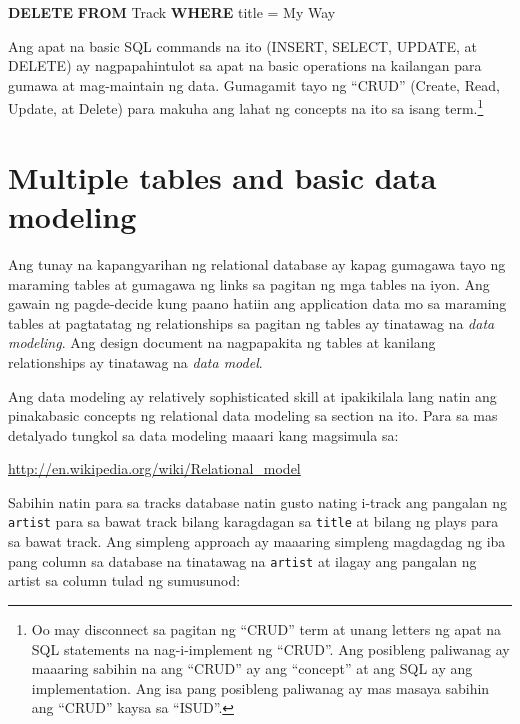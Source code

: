 \documentclass[10pt,]{book}
\newenvironment{Shaded}{}{}
\newcommand{\KeywordTok}[1]{\textcolor[rgb]{0.00,0.44,0.13}{\textbf{#1}}}
\newcommand{\NormalTok}[1]{#1}
\newcommand{\OperatorTok}[1]{\textcolor[rgb]{0.40,0.40,0.40}{#1}}
\newcommand{\StringTok}[1]{\textcolor[rgb]{0.25,0.44,0.63}{#1}}
\begin{document}
\begin{Shaded}
\begin{Highlighting}[]
\KeywordTok{DELETE} \KeywordTok{FROM}\NormalTok{ Track }\KeywordTok{WHERE}\NormalTok{ title }\OperatorTok{=} \StringTok{\textquotesingle{}My Way\textquotesingle{}}
\end{Highlighting}
\end{Shaded}

  Ang apat na basic SQL commands na ito
(INSERT, SELECT, UPDATE, at DELETE) ay nagpapahintulot sa apat na basic
operations na kailangan para gumawa at mag-maintain ng data. Gumagamit
tayo ng ``CRUD'' (Create, Read, Update, at Delete) para makuha ang lahat
ng concepts na ito sa isang term.\footnote{Oo may disconnect sa pagitan
  ng ``CRUD'' term at unang letters ng apat na SQL statements na
  nag-i-implement ng ``CRUD''. Ang posibleng paliwanag ay maaaring
  sabihin na ang ``CRUD'' ay ang ``concept'' at ang SQL ay ang
  implementation. Ang isa pang posibleng paliwanag ay mas masaya sabihin
  ang ``CRUD'' kaysa sa ``ISUD''.}

\section{Multiple tables and basic data
modeling}\label{multiple-tables-and-basic-data-modeling}

  Ang tunay na
kapangyarihan ng relational database ay kapag gumagawa tayo ng maraming
tables at gumagawa ng links sa pagitan ng mga tables na iyon. Ang gawain
ng pagde-decide kung paano hatiin ang application data mo sa maraming
tables at pagtatatag ng relationships sa pagitan ng tables ay tinatawag
na \emph{data modeling}. Ang design document na nagpapakita ng tables at
kanilang relationships ay tinatawag na \emph{data model}.

Ang data modeling ay relatively sophisticated skill at ipakikilala lang
natin ang pinakabasic concepts ng relational data modeling sa section na
ito. Para sa mas detalyado tungkol sa data modeling maaari kang
magsimula sa:

\url{http://en.wikipedia.org/wiki/Relational_model}

 Sabihin natin para sa tracks database natin gusto
nating i-track ang pangalan ng \texttt{artist} para sa bawat track
bilang karagdagan sa \texttt{title} at bilang ng plays para sa bawat
track. Ang simpleng approach ay maaaring simpleng magdagdag ng iba pang
column sa database na tinatawag na \texttt{artist} at ilagay ang
pangalan ng artist sa column tulad ng sumusunod:
\end{document}
